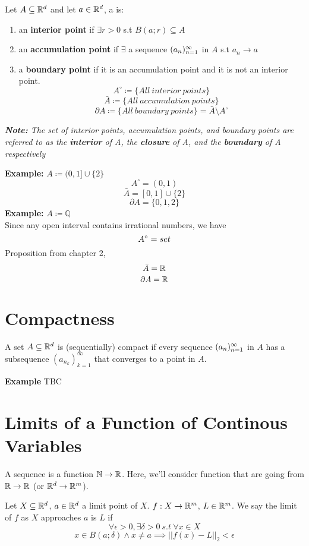 \documentclass[openany]{report}
\begin{document}
\begin{definition}
    Let $A \subseteq \mathbb{R}^d$ and let $a \in \mathbb{R}^d$, a is: 
    \begin{enumerate}[label=(\roman*)]
        \item an \textbf{interior point} if $\exists r > 0$ s.t $B(a;r) \subseteq A$
        \item an \textbf{accumulation point} if $\exists$ a sequence $({a}_n)_{n=1}^\infty$ in $A$ s.t $a_n \rightarrow a$
        \item a \textbf{boundary point} if it is an accumulation point and it is not an interior point.
        $$A^\circ \coloneqq \{All \ interior \ points\}$$
        $$\bar{A} \coloneqq \{All \ accumulation \ points\}$$
        $$\partial A \coloneqq \{All \  boundary 
 \ points\} = \bar{A} \setminus A^\circ$$
    \end{enumerate}
    \begin{center}
        \textit{\textbf{Note:} The set of interior points, accumulation points, and boundary points are referred to as the \textbf{interior} of A, the \textbf{closure} of A, and the \textbf{boundary} of A respectively}
    \end{center}
\end{definition}
\textbf{Example:} $A \coloneqq (0, 1] \cup \{2\}$\\[1ex]
$$A^\circ = (0,1)$$
$$\bar{A} = [0,1] \cup \{2\}$$
$$\partial A = \{0,1,2\}$$
\textbf{Example:} $A \coloneqq \mathbb{Q}$\\[1ex]
Since any open interval contains irrational numbers, we have
$$A^\circ = \empty set$$
Proposition from chapter 2,
$$\bar{A} = \mathbb{R}$$
$$\partial A = \mathbb{R}$$

\chapter{Compactness}
\begin{definition}
    A set $A \subseteq \mathbb{R}^d$ is (sequentially) compact if every sequence $({a}_n)_{n=1}^\infty$ in $A$ has a subsequence $(a_{n_k})^\infty_{k = 1}$ that converges to a point in $A$.
\end{definition}
\textbf{Example}
TBC

\chapter{Limits of a Function of Continous Variables}
A sequence is a function $\mathbb{N} \rightarrow \mathbb{R}$. Here, we'll consider function 
that are going from $\mathbb{R} \rightarrow \mathbb{R}$ (or $\mathbb{R}^d \rightarrow \mathbb{R}^m$).
\begin{definition}
    Let $X \subseteq \mathbb{R}^d$, $a \in \mathbb{R}^d$ a limit point of $X$.
    $f: X \rightarrow \mathbb{R}^m$, $L \in \mathbb{R}^m$. We say the limit of $f$
    as $X$ approaches $a$ is $L$ if 
    $$\forall \epsilon > 0, \exists \delta > 0 \ s.t \ \forall x \in X$$
    $$x\in B(a;\delta) \wedge x \neq a \implies ||f(x)-L||_2 < \epsilon$$
\end{definition}
\end{document}
